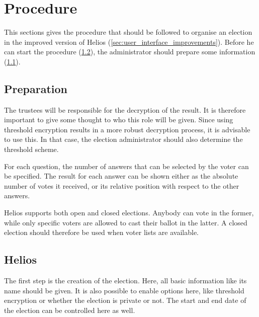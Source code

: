 % 
%

\section{Procedure}
\label{sec:procedure}

This sections gives the procedure that should be followed to organise an election in the improved version of Helios (\ref{sec:user_interface_improvements}). Before he can start the procedure (\ref{sec:proc:helios}), the administrator should prepare some information (\ref{sec:proc:preparation}).

\subsection{Preparation}
\label{sec:proc:preparation}


The trustees will be responsible for the decryption of the result. It is therefore important to give some thought to who this role will be given. Since using threshold encryption results in a more robust decryption process, it is advisable to use this. In that case, the election administrator should also determine the threshold scheme.

\par For each question, the number of answers that can be selected by the voter can be specified. The result for each answer can be shown either as the absolute number of votes it received, or its relative position with respect to the other answers.

\par Helios supports both open and closed elections. Anybody can vote in the former, while only specific voters are allowed to cast their ballot in the latter. A closed election should therefore be used when voter lists are available.

\subsection{Helios}
\label{sec:proc:helios}

The first step is the creation of the election. Here, all basic information like its name should be given. It is also possible to enable options here, like threshold encryption or whether the election is private or not. The start and end date of the election can be controlled here as well.

